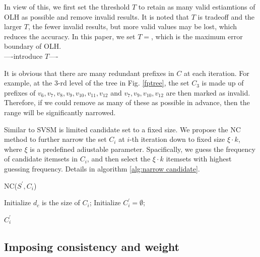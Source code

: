 \documentclass[conference]{IEEEtran}
\begin{document}
In view of this, {\color{red}we first set the threshold $T$ to retain as many valid estiamtions of OLH as possible and remove invalid results. It is noted that $T$ is tradeoff and the larger $T$, the fewer invalid results, but more valid values may be lost, which reduces the accuracy. In this paper, we set $T = $, which is the maximum error boundary of OLH.\\
----introduce $T$----}

It is obvious that there are many redundant prefixes in $C$ at each iteration. For example, at the 3-rd level of the tree in Fig. \ref{fptree}, the set $C_3$ is made up of prefixes of $v_6,v_7,v_8,v_9,v_{10},v_{11},v_{12}$ and $v_7,v_9,v_{10},v_{12}$ are then marked as invalid. Therefore, if we could remove as many of these as possible in advance, then the range will be significantly narrowed.

Similar to SVSM\cite{a2} is limited candidate set to a fixed size. We propose the NC method to further narrow the set $C_i$ at $i$-th iteration down to fixed size $\xi \cdot k$, where $\xi$ is a predefined adiustable parameter. Spacifically, we guess the frequency of candidate itemsets in $C_i$, and then select the $\xi \cdot k$ itemsets with highest guessing frequency. Details in algorithm \ref{alg:narrow candidate}.

\begin{algorithm}[]
\caption{NC($S^{\prime},C_i$)}
\label{alg:narrow candidate}
\begin{algorithmic}[1]

\STATE Initialize $d_c$ is the size of $C_i$;
\STATE Initialize $C^{\prime}_{i} = \emptyset$;
  \STATE 

\ENDIF 

\RETURN $C^{\prime}_{i}$
\end{algorithmic}
\end{algorithm}



\subsection{Imposing consistency and weight}


\end{document}
